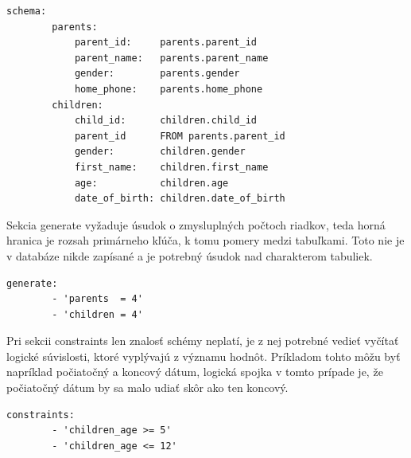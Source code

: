 \begin{lstlisting}[caption={Schema seckcia pre ukážkovú databázu}, label={lst:recipe-schema}]
    schema:
        parents:
            parent_id:     parents.parent_id
            parent_name:   parents.parent_name
            gender:        parents.gender
            home_phone:    parents.home_phone
        children:
            child_id:      children.child_id
            parent_id      FROM parents.parent_id
            gender:        children.gender
            first_name:    children.first_name
            age:           children.age
            date_of_birth: children.date_of_birth
\end{lstlisting}

Sekcia generate vyžaduje úsudok o zmysluplných počtoch riadkov, teda horná hranica je rozsah primárneho kľúča, k tomu pomery medzi tabuľkami. Toto nie je v databáze nikde zapísané a je potrebný úsudok nad charakterom tabuliek.

\begin{lstlisting}[caption={Generate seckcia pre ukážkovú databázu}, label={lst:recipe-generate}]
    generate:
        - 'parents  = 4'
        - 'children = 4'
\end{lstlisting}

Pri sekcii constraints len znalosť schémy neplatí, je z nej potrebné vedieť vyčítať logické súvislosti, ktoré vyplývajú z významu hodnôt. Príkladom tohto môžu byť napríklad počiatočný a koncový dátum, logická spojka v tomto prípade je, že počiatočný dátum by sa malo udiať skôr ako ten koncový.

\begin{lstlisting}[caption={Constraints seckcia pre ukážkovú databázu}, label={lst:recipe-constraints}]
    constraints:
        - 'children_age >= 5'
        - 'children_age <= 12'
\end{lstlisting}


        


